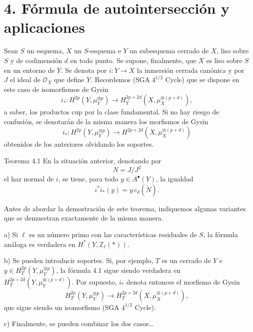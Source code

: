 \section*{4. Fórmula de autointersección y aplicaciones}

Sean $S$ un esquema, $X$ un $S$-esquema e $Y$ un subesquema cerrado de $X$, liso sobre $S$ y de codimensión $d$ en todo punto. Se supone, finalmente, que $X$ es liso sobre $S$ en un entorno de $Y$. Se denota por $i:Y\to X$ la inmersión cerrada canónica y por $J$ el ideal de $\mathcal O_X$ que define $Y$. Recordemos (SGA $4^{1/2}$ Cycle) que se dispone en este caso de isomorfismos de Gysin
\[
i_*:H^{2p}(Y,\mu_Y^{\otimes p})
\to H_Y^{2p+2d}(X,\mu_X^{\otimes(p+d)}),
\]
a saber, los productos cup por la clase fundamental. Si no hay riesgo de confusión, se denotarán de la misma manera los morfismos de Gysin
\[
i_*:H^{2p}(Y,\mu_Y^{\otimes p})
\to H^{2p+2d}(X,\mu_X^{\otimes(p+d)})
\]
obtenidos de los anteriores olvidando los soportes.

\begin{statement}{Teorema 4.1}
En la situación anterior, denotando por
\[
N=J/J^2
\]
el haz normal de $i$, se tiene, para todo $y\in A^{\bullet}(Y)$, la igualdad
\[
i^*i_*(y)=y\,c_d(\check N).
\]
\end{statement}

Antes de abordar la demostración de este teorema, indiquemos algunas variantes que se demuestran exactamente de la misma manera.

a) Si $\ell$ es un número primo con las características residuales de $S$, la fórmula análoga es verdadera en $H^*(Y,\mathbb Z_\ell(*))$.

b) Se pueden introducir soportes. Si, por ejemplo, $T$ es un cerrado de $Y$ e $y\in H_T^{2p}(Y,\mu_Y^{\otimes p})$, la fórmula 4.1 sigue siendo verdadera en $H_T^{2p+2d}(Y,\mu_Y^{\otimes(p+d)})$. Por supuesto, $i_*$ denota entonces el morfismo de Gysin
\[
H_T^{2p}(Y,\mu_Y^{\otimes p})
\to H_T^{2p+2d}(X,\mu_X^{\otimes(p+d)}),
\]
que sigue siendo un isomorfismo (SGA $4^{1/2}$ Cycle).

c) Finalmente, se pueden combinar los dos casos\dots
